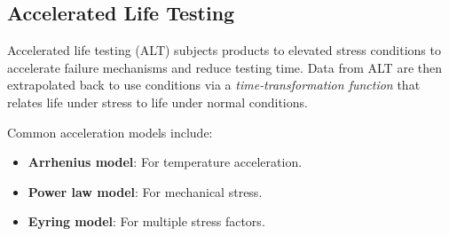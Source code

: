 \documentclass[twoside]{book}
\begin{document}
%
%


\subsection{Accelerated Life Testing}

Accelerated life testing (ALT) subjects products to elevated stress conditions to accelerate failure mechanisms and reduce testing time. Data from ALT are then extrapolated back to use conditions via a \emph{time‐transformation function} that relates life under stress to life under normal conditions.

Common acceleration models include:
\begin{itemize}
\item \textbf{Arrhenius model}: For temperature acceleration.
\item \textbf{Power law model}: For mechanical stress.
\item \textbf{Eyring model}: For multiple stress factors.
\end{itemize}
\end{document}
